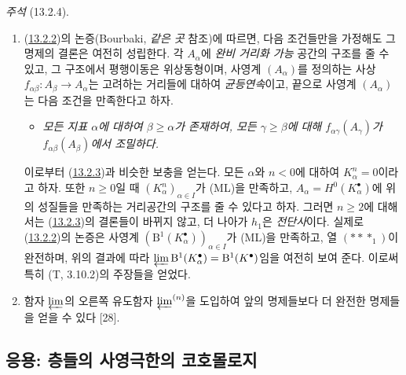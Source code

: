 \begin{env}[13.2.4]
\label{0.13.2.4-fr}
\emph{주석} (13.2.4).
\begin{enumerate}
\item[\emph{(i)}]
(\hyperref[0.13.2.2-fr]{13.2.2})의 논증(Bourbaki,
\emph{같은 곳} 참조)에 따르면, 다음 조건들만을 가정해도 그 명제의
결론은 여전히 성립한다. 각 $A_\alpha$에 \emph{완비 거리화 가능}
공간의 구조를 줄 수 있고, 그 구조에서 평행이동은 위상동형이며,
사영계 $(A_\alpha)$를 정의하는 사상
$f_{\alpha\beta}:A_\beta\to A_\alpha$는 고려하는 거리들에 대하여
\emph{균등연속}이고, 끝으로 사영계 $(A_\alpha)$는 다음 조건을
만족한다고 하자.
\begin{itemize}
\item[\textbf{(ML')}]
\emph{모든 지표 $\alpha$에 대하여 $\beta\geq\alpha$가 존재하여,
모든 $\gamma\geq\beta$에 대해 $f_{\alpha\gamma}(A_\gamma)$가
$f_{\alpha\beta}(A_\beta)$에서 조밀하다.}
\end{itemize}

이로부터 (\hyperref[0.13.2.3-fr]{13.2.3})과 비슷한 보충을 얻는다.
모든 $\alpha$와 $n<0$에 대하여 $K_\alpha^n=0$이라고 하자. 또한
$n\geq0$일 때 $(K_\alpha^n)_{\alpha\in I}$가 (ML)을 만족하고,
$A_\alpha=H^0(K_\alpha^\bullet)$에 위의 성질들을 만족하는 거리공간의
구조를 줄 수 있다고 하자. 그러면 $n\geq2$에 대해서는
(\hyperref[0.13.2.3-fr]{13.2.3})의 결론들이 바뀌지 않고, 더 나아가
$h_1$은 \emph{전단사}이다. 실제로
(\hyperref[0.13.2.2-fr]{13.2.2})의 논증은 사영계
$(\mathrm B^1(K_\alpha^\bullet))_{\alpha\in I}$가 (ML)을 만족하고,
열 $(***_1)$이 완전하며, 위의 결과에 따라
$\varprojlim\mathrm B^1(K_\alpha^\bullet)=\mathrm B^1(K^\bullet)$임을
여전히 보여 준다. 이로써 특히 (T, 3.10.2)의 주장들을 얻었다.

\item[\emph{(ii)}]
함자 $\varprojlim$의 오른쪽 유도함자 $\varprojlim^{(n)}$을 도입하여
앞의 명제들보다 더 완전한 명제들을 얻을 수 있다 [28].
\end{enumerate}
\end{env}

\subsection{응용: 층들의 사영극한의 코호몰로지}
\label{subsection:0.13.3-fr}

